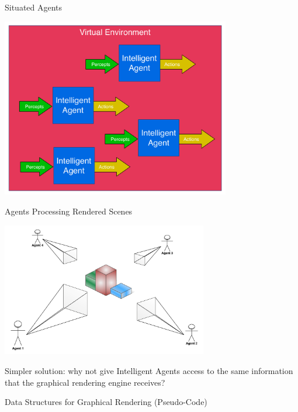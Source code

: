 \documentclass[xcolor=dvipsnames,t]{beamer}
\begin{document}
\begin{frame}{Situated Agents} 
\begin{center}
\includegraphics[width=10cm]{situated-agents} 
\end{center} 
\end{frame} 

\begin{frame}{Agents Processing Rendered Scenes} 
\begin{center}
\includegraphics[width=9cm]{multi-agent-rendering} 
\end{center} 

Simpler solution: why not give Intelligent Agents access to the same
information that the graphical rendering engine receives?
\end{frame} 

\begin{frame}[fragile]{Data Structures for Graphical Rendering (Pseudo-Code)} 
    \begin{mdframed}[style=code2]
         
    \end{mdframed} 
\end{frame} 
\end{document}

